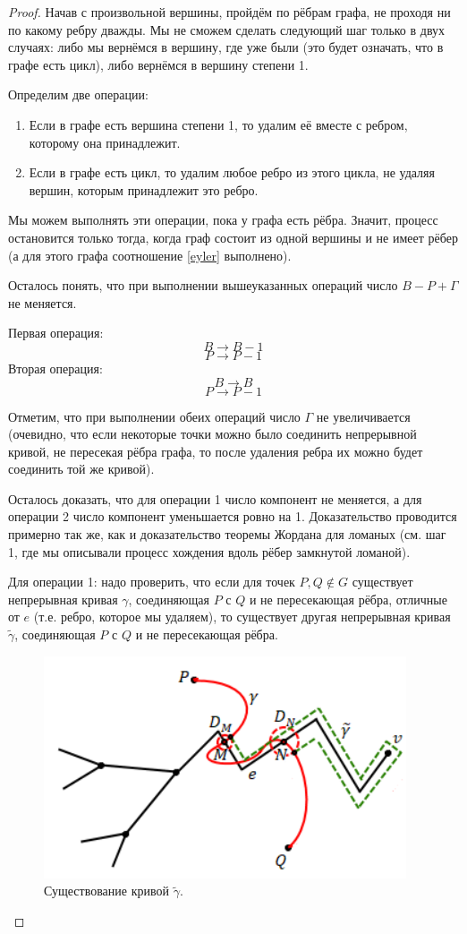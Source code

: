 \begin{proof}
    Начав с произвольной вершины, пройдём по рёбрам графа, не проходя ни по какому ребру дважды. Мы не сможем сделать следующий шаг только в двух случаях: либо мы вернёмся в вершину, где уже были (это будет означать, что в графе есть цикл), либо вернёмся в вершину степени 1.

    Определим две операции:
    \begin{enumerate}
        \item Если в графе есть вершина степени 1, то удалим её вместе с ребром, которому она принадлежит.
        \item Если в графе есть цикл, то удалим любое ребро из этого цикла, не удаляя вершин, которым принадлежит это ребро.
    \end{enumerate}

    Мы можем выполнять эти операции, пока у графа есть рёбра. Значит, процесс остановится только тогда, когда граф состоит из одной вершины и не имеет рёбер (а для этого графа соотношение \eqref{eyler} выполнено).

    Осталось понять, что при выполнении вышеуказанных операций число $B - P + \Gamma$ не меняется.

    Первая операция: \[B \to B - 1\] \[P \to P - 1\]
    Вторая операция: \[B \to B\] \[P \to P - 1\]
    
    Отметим, что при выполнении обеих операций число $\Gamma$ не увеличивается (очевидно, что если некоторые точки можно было соединить непрерывной кривой, не пересекая рёбра графа, то после удаления ребра их можно будет соединить той же кривой).

    Осталось доказать, что для операции 1 число компонент не меняется, а для операции 2 число компонент уменьшается ровно на 1. Доказательство проводится примерно так же, как и доказательство теоремы Жордана для ломаных (см. шаг 1, где мы описывали процесс хождения вдоль рёбер замкнутой ломаной).

    Для операции 1: надо проверить, что если для точек $P,Q \notin G$ существует непрерывная кривая $\gamma$, соединяющая $P$ с $Q$ и не пересекающая рёбра, отличные от $e$ (т.е. ребро, которое мы удаляем), то существует другая непрерывная кривая $\tilde{\gamma}$, соединяющая $P$ с $Q$ и не пересекающая рёбра.

    \begin{figure}[h]
        \centering
        \includegraphics[scale=0.8]{images/c6.1.png}
        \caption{Существование кривой $\tilde{\gamma}$.}
        \label{fig:c6.1}
    \end{figure}


\end{proof}
